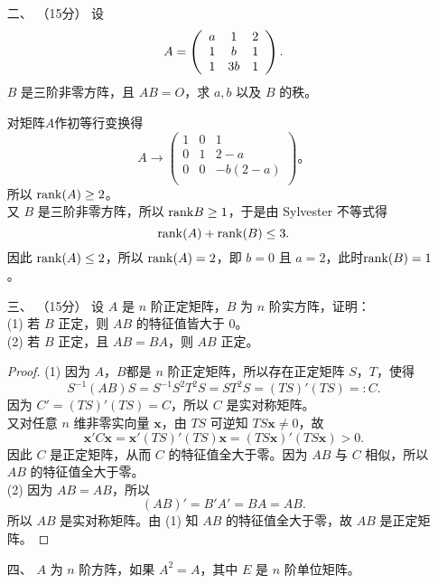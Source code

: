 \begin{enumerate}[1~]
\item[二、]（15分）
设
\[
A = \left( \begin{array} { c c c } { a } & { 1 } & { 2 } \\ { 1 } & { b } & { 1 } \\ { 1 } & { 3 b } & { 1 } \end{array} \right).
\]
$B$ 是三阶非零方阵，且 $AB = O$，求 $a, b$ 以及 $B$ 的秩。
\begin{solution}
对矩阵$A$作初等行变换得\[
A\rightarrow \left( \begin{matrix}
	1&		0&		1\\
	0&		1&		2-a\\
	0&		0&		-b\left( 2-a \right)\\
\end{matrix} \right) 。
\]
所以 ${\rm rank}(A)\ge 2$。\\
又 $B$ 是三阶非零方阵，所以  ${\rm rank}{B}\ge 1$，于是由 Sylvester 不等式得\[
{\rm rank}(A) + {\rm rank}(B) \le 3.
\]
因此 ${\rm rank}(A)\le 2$，所以 ${\rm rank}(A) = 2$，即 $b=0$ 且 $a=2$，此时${\rm rank}(B) = 1$。
\end{solution}
\item[三、]（15分）
设 $A$ 是 $n$ 阶正定矩阵，$B$ 为 $n$ 阶实方阵，证明：\\
(1) 若 $B$ 正定，则 $AB$ 的特征值皆大于 $0$。\\
(2) 若 $B$ 正定，且 $AB = BA$，则 $AB$ 正定。
\begin{proof}
(1) 因为 $A$，$B$都是 $n$ 阶正定矩阵，所以存在正定矩阵 $ S $，$ T $，使得\[
S^{-1} (AB) S = S^{-1} S^2 T^2 S = S T^2 S = (TS)'(TS) =: C.
\]
因为 $C' = (TS)'(TS) = C$，所以 $C$ 是实对称矩阵。\\
又对任意 $ n $ 维非零实向量 $\boldsymbol{x}$，由 $TS$ 可逆知 $TS\boldsymbol{x}\ne0$，故\[
\boldsymbol{x}'C\boldsymbol{x} = \boldsymbol{x}' (TS)'(TS)\boldsymbol{x} = (TS\boldsymbol{x})'(TS\boldsymbol{x}) > 0.
\]
因此 $C$ 是正定矩阵，从而 $C$ 的特征值全大于零。因为 $AB$ 与 $C$ 相似，所以 $AB$ 的特征值全大于零。\\
(2) 因为 $AB = AB$，所以\[
(AB)'=B'A'=BA=AB.
\]
所以 $AB$ 是实对称矩阵。由 (1) 知 $AB$ 的特征值全大于零，故 $AB$ 是正定矩阵。
\end{proof}
\item[四、]
$A$ 为 $n$ 阶方阵，如果 $A^2 = A$，其中 $E$ 是 $n$ 阶单位矩阵。


\end{enumerate}
